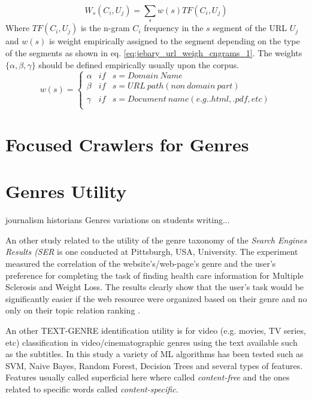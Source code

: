 \begin{equation}\label{eq:jebary_url_weigh_cngrams_1}
	W_{s}(C_{i}, U_{j}) = \sum_{s} w(s) TF(C_{i}, U_{j})
\end{equation}
Where $TF(C_{i}, U_{j}) $ is the n-gram $C_{i}$ frequency in the $s$ segment of the URL $U_{j}$ and $w(s)$ is weight empirically assigned to the segment depending on the type of the segments as shown in eq. \ref{eq:jebary_url_weigh_cngrams_1}. The weights $\{\alpha,\beta,\gamma\}$ should be defined empirically usually upon the corpus. 
\begin{equation}\label{eq:jebary_url_weigh_cngrams_2}
	w(s) = \left\{
    	\begin{array}{lll}
        	\alpha & if & s = Domain\ Name \\
            \beta & if & s = URL\ path (non\ domain\ part) \\
            \gamma & if & s = Document\ name (e.g. .html, .pdf, etc) \\
         \end{array}
  \right.
\end{equation}


\section{Focused Crawlers for Genres}\label{chap:relevant_work:sec:intro}

\section{Genres Utility}\label{chap:relevant_work:sec:intro}
journalism historians
Genres variations on students writing...

An other study related to the utility of the genre taxonomy of the \textit{Search Engines Results (SER} is one conducted at Pittsburgh, USA, University.  The experiment measured the correlation of the website's/web-page's genre and the user's preference for completing the task of finding health care information for Multiple Sclerosis and Weight Loss. The results clearly show that the user's task would be significantly easier if the web resource were organized based on their genre and no only on their topic relation ranking \parencite{chi2018sources}.

An other TEXT-GENRE identification utility is for video (e.g. movies, TV series, etc) classification in video/cinematographic genres using the text available such as the subtitles. In this study a variety of ML algorithms has been tested such as SVM, Naive Bayes, Random Forest, Decision Trees and several types of features. Features usually called superficial here where called \textit{content-free} and the ones related to specific words called \textit{content-specific}\parencite{lee2017text}.

